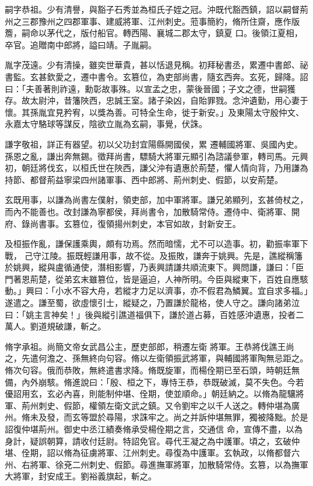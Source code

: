 \begin{pinyinscope}
 嗣字恭祖。少有清譽，與豁子石秀並為桓氏子姪之冠。沖既代豁西鎮，詔以嗣督荊州之三郡豫州之四郡軍事、建威將軍、江州刺史。蒞事簡約，脩所住齋，應作版簷，嗣命以茅代之，版付船官。轉西陽、襄城二郡太守，鎮夏
 口。後領江夏相，卒官。追贈南中郎將，謚曰靖。子胤嗣。



 胤字茂遠。少有清操，雖奕世華貴，甚以恬退見稱。初拜秘書丞，累遷中書郎、祕書監。玄甚欽愛之，遷中書令。玄篡位，為吏部尚書，隨玄西奔。玄死，歸降。詔曰：「夫善著則祚遠，勳彰故事殊。以宣孟之忠，蒙後晉國；子文之德，世嗣獲存。故太尉沖，昔籓陜西，忠誠王室。諸子染凶，自貽罪戮。念沖遺勤，用心妻于懷。其孫胤宜見矜宥，以獎為善。可特全生命，徙于新安。」及東陽太守殷仲文、永嘉太守駱球等謀反，陰欲立胤為玄嗣，事覺，伏誅。



 謙字敬祖，詳正有器望。初以父功封宜陽縣開國侯，累
 遷輔國將軍、吳國內史。孫恩之亂，謙出奔無錫。徵拜尚書，驃騎大將軍元顯引為諮議參軍，轉司馬。元興初，朝廷將伐玄，以桓氏世在陜西，謙父沖有遺惠於荊楚，懼人情向背，乃用謙為持節、都督荊益寧梁四州諸軍事、西中郎將、荊州刺史、假節，以安荊楚。



 玄既用事，以謙為尚書左僕射，領吏部，加中軍將軍。謙兄弟顯列，玄甚倚杖之，而內不能善也。改封謙為寧都侯，拜尚書令，加散騎常侍。遷侍中、衛將軍、開府、錄尚書事。玄篡位，復領揚州刺史，本官如故，封新安王。



 及桓振作亂，謙保護乘輿，頗有功焉。然而暗懦，尤不可以造事。初，勸振率軍下戰，
 己守江陵。振既輕謙用事，故不從。及振敗，謙奔于姚興。先是，譙縱稱籓於姚興，縱與盧循通使，潛相影響，乃表興請謙共順流東下。興問謙，謙曰：「臣門著恩荊楚，從弟玄末雖篡位，皆是逼迫，人神所明。今臣與縱東下，百姓自應駭動。」興曰：「小水不容大舟，若縱才力足以濟事，亦不假君為鱗翼。宜自求多福。」遂遣之。謙至蜀，欲虛懷引士，縱疑之，乃置謙於龍格，使人守之。謙向諸弟泣曰：「姚主言神矣！」後與縱引譙道福俱下，謙於道占募，百姓感沖遺惠，投者二萬人。劉道規破謙，斬之。



 脩字承祖。尚簡文帝女武昌公主，歷吏部郎，稍遷左衛
 將軍。王恭將伐譙王尚之，先遣何澹之、孫無終向句容。脩以左衛領振武將軍，與輔國將軍陶無忌距之。脩次句容。俄而恭敗，無終遣書求降。脩既旋軍，而楊佺期已至石頭，時朝廷無備，內外崩駭。脩進說曰：「殷、桓之下，專恃王恭，恭既破滅，莫不失色。今若優詔用玄，玄必內喜，則能制仲堪、佺期，使並順命。」朝廷納之。以脩為龍驤將軍、荊州刺史、假節，權領左衛文武之鎮。又令劉牢之以千人送之。轉仲堪為廣州。脩未及發，而玄等盟於尋陽，求誅牢之。尚之并訴仲堪無罪，獨被降黜。於是詔復仲堪荊州。御史中丞江績奏脩承受楊佺期之言，交通信
 命，宣傳不盡，以為身計，疑誤朝算，請收付廷尉。特詔免官。尋代王凝之為中護軍。頃之，玄破仲堪、佺期，詔以脩為征虜將軍、江州刺史。尋復為中護軍。玄執政，以脩都督六州、右將軍、徐兗二州刺史、假節。尋進撫軍將軍，加散騎常侍。玄篡，以為撫軍大將軍，封安成王。劉裕義旗起，斬之。




\end{pinyinscope}
